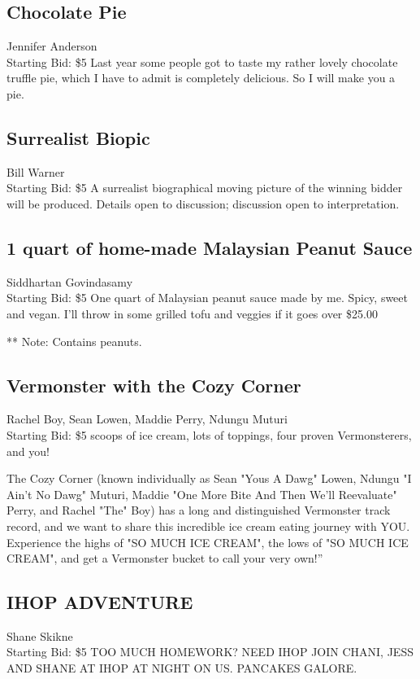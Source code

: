 \documentclass[11pt]{article}
\begin{document}
\subsection{Chocolate Pie}
Jennifer Anderson
\\
Starting Bid: \$5
\newline
Last year some people got to taste my rather lovely chocolate truffle pie, which I have to admit is completely delicious. So I will make you a pie.
\subsection{Surrealist Biopic}
Bill Warner
\\
Starting Bid: \$5
\newline
A surrealist biographical moving picture of the winning bidder will be produced. Details open to discussion; discussion open to interpretation.
\subsection{1 quart of home-made Malaysian Peanut Sauce}
Siddhartan Govindasamy
\\
Starting Bid: \$5
\newline
One quart of Malaysian peanut sauce made by me. Spicy, sweet and vegan. I'll throw in some grilled tofu and veggies if it goes over \$25.00

** Note: Contains peanuts.
\subsection{Vermonster with the Cozy Corner}
Rachel Boy, Sean Lowen, Maddie Perry, Ndungu Muturi
\\
Starting Bid: \$5
 scoops of ice cream, lots of toppings, four proven Vermonsterers, and you! 

The Cozy Corner (known individually as Sean "Yous A Dawg" Lowen, Ndungu "I Ain't No Dawg" Muturi, Maddie "One More Bite And Then We'll Reevaluate" Perry, and Rachel "The" Boy) has a long and distinguished Vermonster track record, and we want to share this incredible ice cream eating journey with YOU. Experience the highs of "SO MUCH ICE CREAM", the lows of "SO MUCH ICE CREAM", and get a Vermonster bucket to call your very own!”
\subsection{IHOP ADVENTURE}
Shane Skikne
\\
Starting Bid: \$5
\newline
TOO MUCH HOMEWORK? NEED IHOP JOIN CHANI, JESS AND SHANE AT IHOP AT NIGHT ON US. PANCAKES GALORE.
\end{document}

